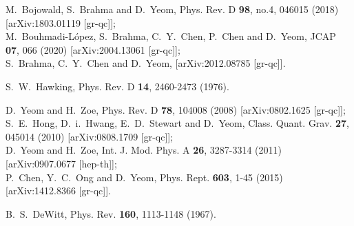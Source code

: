 \documentclass{andromedaone}
\begin{document}

\begin{thebibliography}{99}

M.~Bojowald, S.~Brahma and D.~Yeom,
Phys. Rev. D \textbf{98}, no.4, 046015 (2018)
[arXiv:1803.01119 [gr-qc]];\\
M.~Bouhmadi-L\'opez, S.~Brahma, C.~Y.~Chen, P.~Chen and D.~Yeom,
JCAP \textbf{07}, 066 (2020)
[arXiv:2004.13061 [gr-qc]];\\
S.~Brahma, C.~Y.~Chen and D.~Yeom,
[arXiv:2012.08785 [gr-qc]].

S.~W.~Hawking,
Phys. Rev. D \textbf{14}, 2460-2473 (1976).


D.~Yeom and H.~Zoe,
Phys. Rev. D \textbf{78}, 104008 (2008)
[arXiv:0802.1625 [gr-qc]];\\
S.~E.~Hong, D.~i.~Hwang, E.~D.~Stewart and D.~Yeom,
Class. Quant. Grav. \textbf{27}, 045014 (2010)
[arXiv:0808.1709 [gr-qc]];\\
D.~Yeom and H.~Zoe,
Int. J. Mod. Phys. A \textbf{26}, 3287-3314 (2011)
[arXiv:0907.0677 [hep-th]];\\
P.~Chen, Y.~C.~Ong and D.~Yeom,
Phys. Rept. \textbf{603}, 1-45 (2015)
[arXiv:1412.8366 [gr-qc]].

B.~S.~DeWitt,
Phys. Rev. \textbf{160}, 1113-1148 (1967).



\end{thebibliography}
\end{document}
